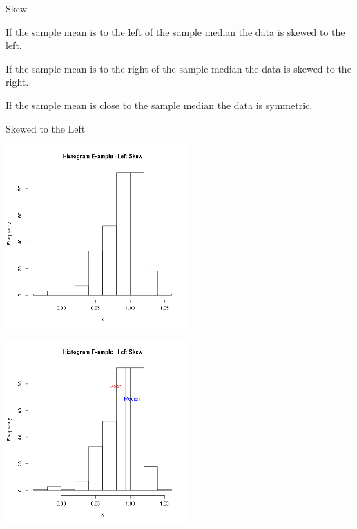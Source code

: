 \begin{frame}{Skew}

  \begin{definition}
    If the sample mean is to the left of the sample median the data is
    skewed to the left.
  \end{definition}

  \begin{definition}
    If the sample mean is to the right of the sample median the data
    is skewed to the right.
  \end{definition}

  \begin{definition}[Symmetric]
    If the sample mean is close to the sample median the data is symmetric.
  \end{definition}
  
\end{frame}

\begin{frame}{Skewed to the Left}

  {
    \includegraphics[width=7cm]{img/leftSkew}
  }

  {
    \includegraphics[width=7cm]{img/leftSkewAnnotated}
  }

  
\end{frame}


